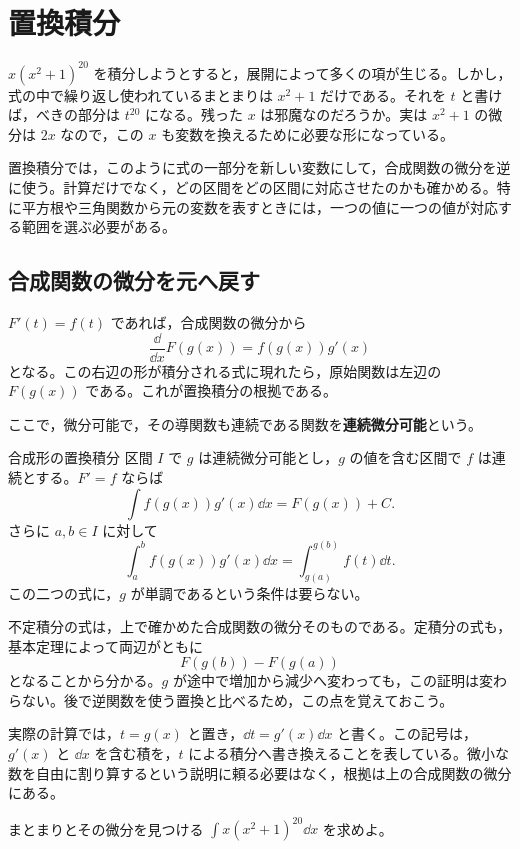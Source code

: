 \chapter{置換積分}\label{章:置換積分}

$x(x^2+1)^{20}$ を積分しようとすると，展開によって多くの項が生じる。しかし，式の中で繰り返し使われているまとまりは $x^2+1$ だけである。それを $t$ と書けば，べきの部分は $t^{20}$ になる。残った $x$ は邪魔なのだろうか。実は $x^2+1$ の微分は $2x$ なので，この $x$ も変数を換えるために必要な形になっている。

置換積分では，このように式の一部分を新しい変数にして，合成関数の微分を逆に使う。計算だけでなく，どの区間をどの区間に対応させたのかも確かめる。特に平方根や三角関数から元の変数を表すときには，一つの値に一つの値が対応する範囲を選ぶ必要がある。

\section{合成関数の微分を元へ戻す}\label{節:合成形の置換}

$F'(t)=f(t)$ であれば，合成関数の微分から
\[
 \frac{\dd}{\dd x}F(g(x))=f(g(x))g'(x)
\]
となる。この右辺の形が積分される式に現れたら，原始関数は左辺の $F(g(x))$ である。これが置換積分の根拠である。

ここで，微分可能で，その導関数も連続である関数を\textbf{連続微分可能}という。\label{用語:連続微分可能}

\begin{theorem}{合成形の置換積分}
区間 $I$ で $g$ は連続微分可能とし，$g$ の値を含む区間で $f$ は連続とする。$F'=f$ ならば
\[
 \int f(g(x))g'(x)\dd x=F(g(x))+C.
\]
さらに $a,b\in I$ に対して
\[
 \int_a^b f(g(x))g'(x)\dd x
 =\int_{g(a)}^{g(b)}f(t)\dd t.
\]
この二つの式に，$g$ が単調であるという条件は要らない。
\end{theorem}

不定積分の式は，上で確かめた合成関数の微分そのものである。定積分の式も，基本定理によって両辺がともに
\[
 F(g(b))-F(g(a))
\]
となることから分かる。$g$ が途中で増加から減少へ変わっても，この証明は変わらない。後で逆関数を使う置換と比べるため，この点を覚えておこう。

実際の計算では，$t=g(x)$ と置き，$\dd t=g'(x)\dd x$ と書く。この記号は，$g'(x)$ と $\dd x$ を含む積を，$t$ による積分へ書き換えることを表している。微小な数を自由に割り算するという説明に頼る必要はなく，根拠は上の合成関数の微分にある。

\begin{example}{まとまりとその微分を見つける}
$\int x(x^2+1)^{20}\dd x$ を求めよ。
\end{example}

